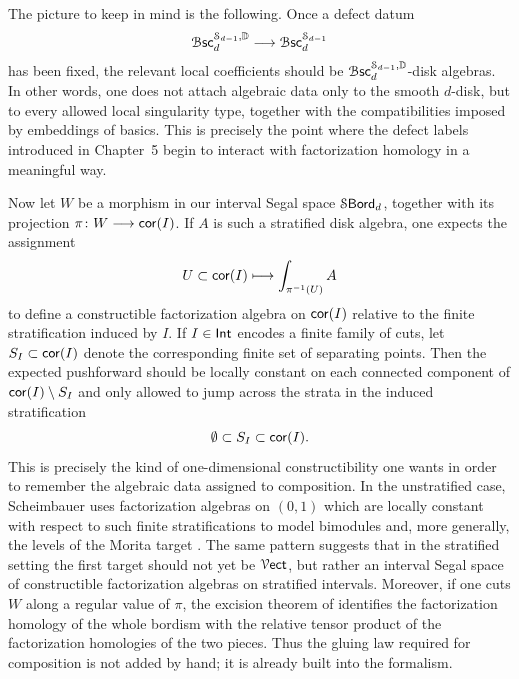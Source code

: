 The picture to keep in mind is the following. Once a defect datum
\begin{equation}
    \operatorname{\mathcal B\mathsf{sc}}_{d}^{\mathcal S_{d-1},\mathbb D} \longrightarrow \operatorname{\mathcal B\mathsf{sc}}_{d}^{\mathcal S_{d-1}}
\end{equation}
has been fixed, the relevant local coefficients should be $\operatorname{\mathcal B\mathsf{sc}}_{d}^{\mathcal S_{d-1},\mathbb D}$-disk algebras. In other words, one does not attach algebraic data only to the smooth $d$-disk, but to every allowed local singularity type, together with the compatibilities imposed by embeddings of basics. This is precisely the point where the defect labels introduced in Chapter~5 begin to interact with factorization homology in a meaningful way.

Now let $W$ be a morphism in our interval Segal space $\operatorname{\mathcal S\mathsf{Bord}}_d$, together with its projection $\pi\colon W \longrightarrow \operatorname{{\sf cor}}(I)$. If $A$ is such a stratified disk algebra, one expects the assignment
\begin{equation}
    U \subset \operatorname{{\sf cor}}(I) \longmapsto \int_{\pi^{-1}(U)} A
\end{equation}
to define a constructible factorization algebra on $\operatorname{{\sf cor}}(I)$ relative to the finite stratification induced by $I$. If $I\in \operatorname{\mathsf{Int}}$ encodes a finite family of cuts, let $S_{I}\subset \operatorname{{\sf cor}}(I)$ denote the corresponding finite set of separating points. Then the expected pushforward should be locally constant on each connected component of $\operatorname{{\sf cor}}(I)\setminus S_{I}$ and only allowed to jump across the strata in the induced stratification
\begin{equation}
    \emptyset \subset S_{I} \subset \operatorname{{\sf cor}}(I).
\end{equation}
This is precisely the kind of one-dimensional constructibility one wants in order to remember the algebraic data assigned to composition. In the unstratified case, Scheimbauer uses factorization algebras on $(0,1)$ which are locally constant with respect to such finite stratifications to model bimodules and, more generally, the levels of the Morita target \cite[Corollary~3.2.25 and Definition~3.2.27]{Sch14}. The same pattern suggests that in the stratified setting the first target should not yet be $\operatorname{\mathcal V{\sf ect}}$, but rather an interval Segal space of constructible factorization algebras on stratified intervals. Moreover, if one cuts $W$ along a regular value of $\pi$, the excision theorem of \cite{AFT3} identifies the factorization homology of the whole bordism with the relative tensor product of the factorization homologies of the two pieces. Thus the gluing law required for composition is not added by hand; it is already built into the formalism.

